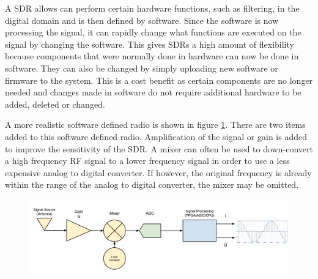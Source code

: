 A SDR allows can perform certain hardware functions, such as filtering, in the digital domain and is then defined by software.  Since the software is now processing the signal, it can rapidly change what functions are executed on the signal by changing the software.  This gives SDRs a high amount of flexibility because components that were normally done in hardware can now be done in software.  They can also be changed by simply uploading new software or firmware to the system.  This is a cost benefit as certain components are no longer needed and changes made in software do not require additional hardware to be added, deleted or changed.

A more realistic software defined radio is shown in figure \ref{prac_sdr}.  There are two items added to this software defined radio.  Amplification of the signal or gain is added to improve the sensitivity of the SDR.  A mixer can often be used to down-convert a high frequency RF signal to a lower frequency signal in order to use a less expensive analog to digital converter.  If however, the original frequency is already within the range of the analog to digital converter, the mixer may be omitted.  


{\begin{figure}[h!tb] 
\centering
\includegraphics[width=\textwidth]{Images/SDR_Prac_block.pdf}
\label{prac_sdr}
\end{figure}
}

